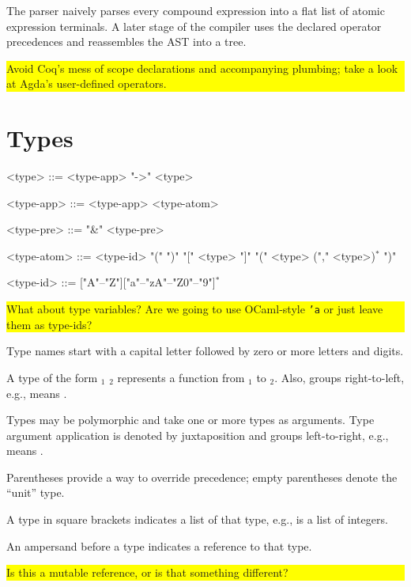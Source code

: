 \documentclass{article}
\def\<#1>{\synt{#1}}
\newcommand{\fixme}[1]{
  \noindent\colorbox{yellow}{\parbox{\dimexpr\linewidth-2\fboxsep}{#1}}%
}
\begin{document}
The parser naively parses every compound expression into a flat list of atomic
expression terminals. A later stage of the compiler uses the declared operator
precedences and reassembles the AST into a tree.

\fixme{Avoid Coq's mess of scope declarations and accompanying plumbing; take
a look at Agda's user-defined operators.}

\section{Types}

\setlength{\grammarindent}{6em}
\begin{grammar}
<type> ::= <type-app> "->" <type>

<type-app> ::= <type-app> <type-atom>

<type-pre> ::= "&" <type-pre>

<type-atom> ::= <type-id>
\alt "(" ")"
\alt "[" <type> "]"
\alt "(" <type> ("," <type>)$^*$ ")"

<type-id> ::= ["A"--"Z"]["a"--"zA"--"Z0"--"9"]$^*$
\end{grammar}

\fixme{What about type variables?  Are we going to use OCaml-style \texttt{'a}
  or just leave them as type-ids?}

Type names start with a capital letter followed by zero or more
letters and digits.

A type of the form \<type>$_1$ \lit*{->} \<type>$_2$ represents a function
from \<type>$_1$ to \<type>$_2$. Also, \lit*{->} groups
right-to-left, e.g.,
 \lit*{->}  \lit*{->} 
means
 \lit*{->} \lit*{(}  \lit*{->}  \lit*{)}.

Types may be polymorphic and take one or more types as arguments.
Type argument application is denoted by juxtaposition and groups
left-to-right, e.g.,
  
means
\lit*{(}   \lit*{)} .

Parentheses provide a way to override precedence; empty parentheses
\lit*{()} denote the ``unit'' type.

A type in square brackets indicates a list of that type, e.g.,
\lit*{[}  \lit*{]} is a list of integers.

An ampersand \lit*{\&} before a type indicates a reference to that type.

\fixme{Is this a mutable reference, or is that something different?}
\end{document}
